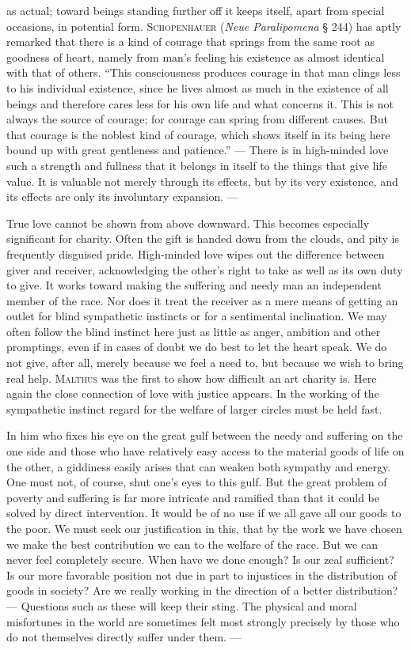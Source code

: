 \documentclass[12pt,a4paper,openany]{book}
\newcommand{\opage}[1]{\marginnote{\footnotesize\textit{[#1]}}}
\begin{document}
as actual; toward beings standing further off it keeps itself, apart from special occasions, in potential form.
\textsc{Schopenhauer} (\textit{Neue Paralipomena} § 244) has aptly remarked that there is a kind of courage that
springs from the same root as goodness of heart, namely from man's feeling his existence as almost identical with that
of others. ``This consciousness produces courage in that man clings less to his individual existence, since he lives
almost as much in the existence of all beings and therefore cares less for his own life and what concerns it. This is
not always the source of courage; for courage can spring from different causes. But that courage is the noblest kind
of courage, which shows itself in its being here bound up with great gentleness and patience.'' --- There is in
high-minded love such a strength and fullness that it belongs in itself to the things that give life value. It is
valuable not merely through its effects,
\opage{244}but by its very existence, and its effects are only its involuntary expansion. ---

True love cannot be shown from above downward. This becomes especially significant for charity. Often the gift is
handed down from the clouds, and pity is frequently disguised pride. High-minded love wipes out the difference
between giver and receiver, acknowledging the other's right to take as well as its own duty to give. It works toward
making the suffering and needy man an independent member of the race. Nor does it treat the receiver as a mere means
of getting an outlet for blind sympathetic instincts or for a sentimental inclination. We may often follow the blind
instinct here just as little as anger, ambition and other promptings, even if in cases of doubt we do best to let the
heart speak. We do not give, after all, merely because we feel a need to, but because we wish to bring real help.
\textsc{Malthus} was the first to show how difficult an art charity is. Here again the close connection of love with
justice appears. In the working of the sympathetic instinct regard for the welfare of larger circles must be held
fast.

In him who fixes his eye on the great gulf between the needy and suffering on the one side and those who have
relatively easy access to the material goods of life on the other, a giddiness easily arises that can weaken both
sympathy and energy. One must not, of course, shut one's eyes to this gulf. But the great problem of poverty and
suffering is far more intricate and ramified than that it could be solved by direct intervention. It would be of no
use if we all gave all our goods to the poor. We must seek our justification in this, that by the work we have chosen
we make the best contribution we can to the welfare of the race. But we can never feel completely secure. When have
we done enough? Is our zeal sufficient? Is our more favorable position not due in part to injustices in the
distribution of goods in society? Are we really working in the direction of a better distribution? --- Questions such
as these will keep their sting. The physical and moral misfortunes
\opage{245}in the world are sometimes felt most strongly precisely by those who do not themselves directly suffer
under them. ---
\end{document}
